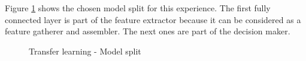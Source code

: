 \noindent Figure \ref{fig:tl_model_split} shows the chosen model split for this experience. The first fully connected layer is part of the feature extractor because it can be considered as a feature gatherer and assembler. The next ones are part of the decision maker. 

\begin{figure}[!h]
\centering
\noindent
{}
\caption{Transfer learning - Model split}
\label{fig:tl_model_split}
\end{figure}


%
%


